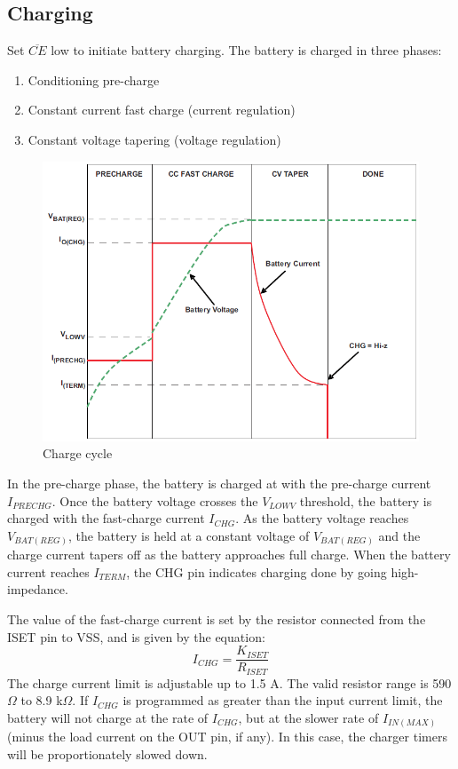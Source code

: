 \documentclass[11pt,a4paper]{article}
\begin{document}
\subsection{Charging}
Set $\overline{CE}$ low to initiate battery charging. The battery is charged in three phases: 
\begin{enumerate}
	\item Conditioning pre-charge
	\item Constant current fast charge (current regulation) 
	\item Constant voltage tapering (voltage regulation)
\end{enumerate}
\begin{figure}[!ht]
	\centering
	\includegraphics[width=1.0\linewidth]{Charge_cycle}
	\caption{Charge cycle}
	\label{fig:Charge _cycle}
\end{figure}
In the pre-charge phase, the battery is charged at with the pre-charge current $I_{PRECHG}$. Once the battery voltage crosses the $V_{LOWV}$ threshold, the battery is charged with the fast-charge current $I_{CHG}$. As the battery voltage reaches $V_{BAT(REG)}$, the battery is held at a constant voltage of $V_{BAT(REG)}$ and the charge current tapers off as the battery approaches full charge. When the battery current reaches $I_{TERM}$, the CHG pin indicates charging done by going high-impedance.

The value of the fast-charge current is set by the resistor connected from the ISET pin to VSS, and is given by the equation:
\[ I_{CHG} = \frac{K_{ISET}}{R_{ISET}} \]
The charge current limit is adjustable up to 1.5 A. The valid resistor range is 590 $\Omega$ to 8.9 k$\Omega$. If $I_{CHG}$ is programmed as greater than the input current limit, the battery will not charge at the rate of $I_{CHG}$, but at the slower rate of $I_{IN(MAX)}$ (minus the load current on the OUT pin, if any). In this case, the charger timers will be proportionately slowed down.
\end{document}
